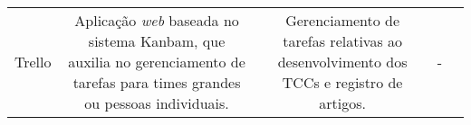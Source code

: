 \begin{table}[]
\begin{tabular}{|c|c|c|c|c}
\begin{minipage} [t] {0.3\textwidth} \centering Trello \cite{trello2011} \end{minipage}                     & \begin{minipage} [t] {0.3\textwidth} \centering  Aplicação \emph{web} baseada no sistema Kanbam, que auxilia no gerenciamento de tarefas para times grandes ou pessoas individuais.   \end{minipage} 	& \begin{minipage} [t] {0.2\textwidth} \centering Gerenciamento de tarefas relativas ao desenvolvimento dos TCCs e registro de artigos. \end{minipage}	 & \begin{minipage} [t] {0.1\textwidth} \centering  - \end{minipage} &  \\ \cline{1-4}
\end{tabular}
\end{table}


